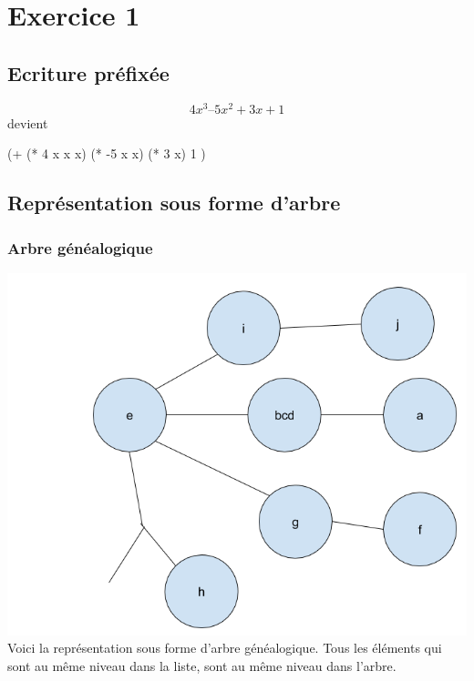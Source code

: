 \documentclass[a4paper,10pt]{report}
\begin{document}
\chapter{Exercice 1}

  \section{Ecriture préfixée}
  
  $$4x^3 – 5x^2 + 3x + 1 $$ devient \begin{center}(+ (* 4 x x x) (* -5 x x) (* 3 x) 1 )\end{center}
  
  \section{Représentation sous forme d'arbre}
  \subsection*{Arbre généalogique}
  \includegraphics[scale = 0.4]{schema}\newline
  Voici la représentation sous forme d'arbre généalogique. Tous les éléments qui sont au même niveau dans la liste, sont au même niveau dans l'arbre.
\end{document}
